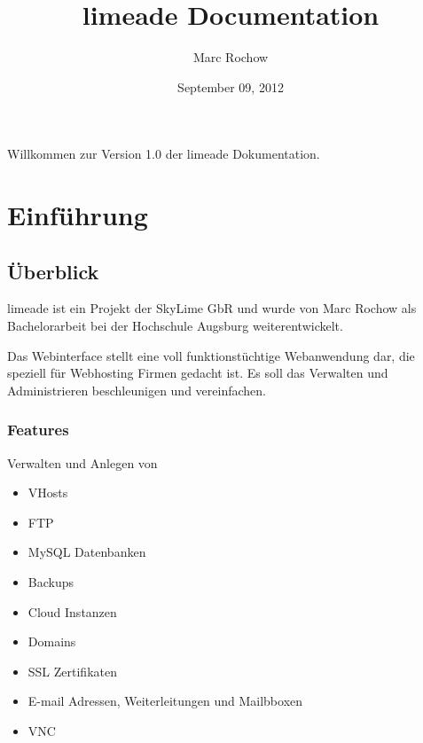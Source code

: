 \documentclass[letterpaper,10pt,english]{sphinxmanual}
\title{limeade Documentation}
\date{September 09, 2012}
\author{Marc Rochow}
\begin{document}
\maketitle
\tableofcontents
{}\label{index::doc}


Willkommen zur Version 1.0 der limeade Dokumentation.


\chapter{Einführung}
\label{index:limeade-dokumentation}\label{index:einfuhrung}

\section{Überblick}
\label{getting-started/overview:uberblick}\label{getting-started/overview::doc}
limeade ist ein Projekt der SkyLime GbR und wurde von Marc Rochow als
Bachelorarbeit bei der Hochschule Augsburg weiterentwickelt.

Das Webinterface stellt eine voll funktionstüchtige Webanwendung dar, die
speziell für Webhosting Firmen gedacht ist. Es soll das Verwalten und
Administrieren beschleunigen und vereinfachen.


\subsection{Features}
\label{getting-started/overview:features}
Verwalten und Anlegen von
\begin{itemize}
\item {} 
VHosts

\item {} 
FTP

\item {} 
MySQL Datenbanken

\item {} 
Backups

\item {} 
Cloud Instanzen

\item {} 
Domains

\item {} 
SSL Zertifikaten

\item {} 
E-mail Adressen, Weiterleitungen und Mailbboxen

\item {} 
VNC

\end{itemize}
\end{document}

